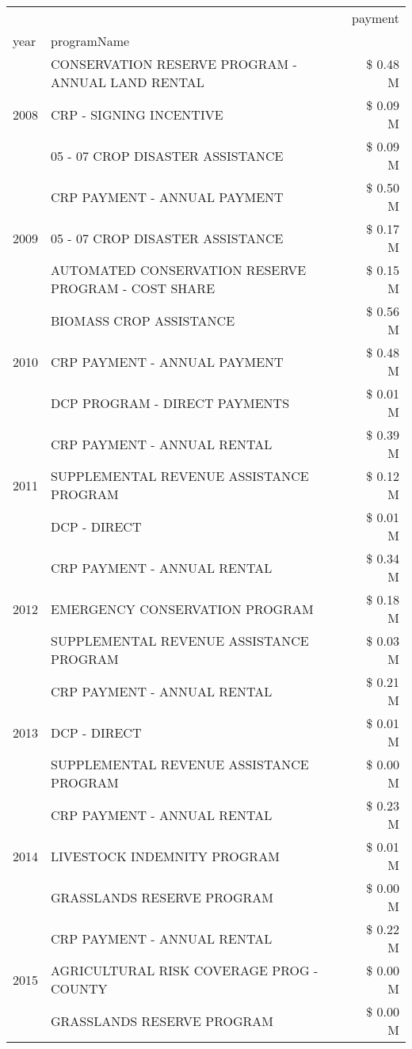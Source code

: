 \begin{tabular}{llr}
\toprule
 &  & payment \\
year & programName &  \\
\midrule
\multirow[t]{3}{*}{2008} & CONSERVATION RESERVE PROGRAM - ANNUAL LAND RENTAL & \$ 0.48 M \\
 & CRP - SIGNING INCENTIVE & \$ 0.09 M \\
 & 05 - 07 CROP DISASTER ASSISTANCE & \$ 0.09 M \\
\cline{1-3}
\multirow[t]{3}{*}{2009} & CRP PAYMENT - ANNUAL PAYMENT & \$ 0.50 M \\
 & 05 - 07 CROP DISASTER ASSISTANCE & \$ 0.17 M \\
 & AUTOMATED CONSERVATION RESERVE PROGRAM - COST SHARE & \$ 0.15 M \\
\cline{1-3}
\multirow[t]{3}{*}{2010} & BIOMASS CROP ASSISTANCE & \$ 0.56 M \\
 & CRP PAYMENT - ANNUAL PAYMENT & \$ 0.48 M \\
 & DCP PROGRAM - DIRECT PAYMENTS & \$ 0.01 M \\
\cline{1-3}
\multirow[t]{3}{*}{2011} & CRP PAYMENT - ANNUAL RENTAL & \$ 0.39 M \\
 & SUPPLEMENTAL REVENUE ASSISTANCE PROGRAM & \$ 0.12 M \\
 & DCP - DIRECT & \$ 0.01 M \\
\cline{1-3}
\multirow[t]{3}{*}{2012} & CRP PAYMENT - ANNUAL RENTAL & \$ 0.34 M \\
 & EMERGENCY CONSERVATION PROGRAM & \$ 0.18 M \\
 & SUPPLEMENTAL REVENUE ASSISTANCE PROGRAM & \$ 0.03 M \\
\cline{1-3}
\multirow[t]{3}{*}{2013} & CRP PAYMENT - ANNUAL RENTAL & \$ 0.21 M \\
 & DCP - DIRECT & \$ 0.01 M \\
 & SUPPLEMENTAL REVENUE ASSISTANCE PROGRAM & \$ 0.00 M \\
\cline{1-3}
\multirow[t]{3}{*}{2014} & CRP PAYMENT - ANNUAL RENTAL & \$ 0.23 M \\
 & LIVESTOCK INDEMNITY PROGRAM & \$ 0.01 M \\
 & GRASSLANDS RESERVE PROGRAM & \$ 0.00 M \\
\cline{1-3}
\multirow[t]{3}{*}{2015} & CRP PAYMENT - ANNUAL RENTAL & \$ 0.22 M \\
 & AGRICULTURAL RISK COVERAGE PROG - COUNTY & \$ 0.00 M \\
 & GRASSLANDS RESERVE PROGRAM & \$ 0.00 M \\

\end{tabular}
